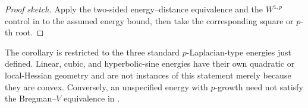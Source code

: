 \begin{proof}[Proof sketch]
Apply the two-sided energy--distance equivalence and the $W^{1,p}$ control in  to the assumed energy bound, then take the corresponding square or $p$-th root.
\end{proof}

\begin{remark}[Scope]
The corollary is restricted to the three standard \(p\)-Laplacian-type energies just defined. Linear,
cubic, and hyperbolic-sine energies have their own quadratic or local-Hessian geometry and are not
instances of this statement merely because they are convex. Conversely, an unspecified energy with
\(p\)-growth need not satisfy the Bregman--\(V\) equivalence in .
\end{remark}
